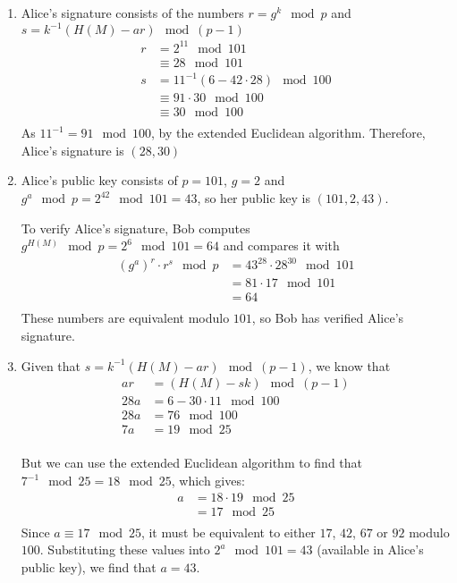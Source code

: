 \begin{enumerate}
\item Alice's signature consists of the numbers $r = g^k\mod p$ and
  $s = k^{-1}(H(M) - ar)\mod (p-1)$
  \begin{align*}
    r &= 2^{11} \mod 101 \\
      &\equiv 28 \mod 101 \\
    s &= 11^{-1}(6 - 42 \cdot 28)\mod 100 \\
      &\equiv 91 \cdot 30\mod 100 \\
      &\equiv 30 \mod 100\\
  \end{align*}
  As $11^{-1} = 91\mod 100$, by the extended Euclidean algorithm. Therefore, Alice's signature is $(28, 30)$

\item Alice's public key consists of $p = 101$, $g = 2$ and $g^a \mod p = 2^{42}
  \mod 101 = 43$, so her public key is $(101, 2, 43)$.

  To verify Alice's signature, Bob computes $g^{H(M)} \mod p = 2^6 \mod 101 = 64$
  and compares it with
  \begin{align*}
    (g^a)^r \cdot r^s \mod p &= 43^{28} \cdot 28^{30} \mod 101 \\
                             &= 81 \cdot 17 \mod 101 \\
                             &= 64 \\
  \end{align*}
  These numbers are equivalent modulo $101$, so Bob has verified Alice's signature.

\item Given that $s = k^{-1}(H(M) - ar)\mod (p-1)$, we know that
  \begin{align*}
    ar &= (H(M) - sk) \mod (p-1) \\
    28a &= 6 - 30 \cdot 11 \mod 100 \\
    28a &= 76 \mod 100 \\
    7a &= 19 \mod 25 \\
  \end{align*}

  But we can use the extended Euclidean algorithm to find that $7^{-1} \mod 25
  = 18 \mod 25$, which gives:
  \begin{align*}
    a &= 18 \cdot 19 \mod 25 \\
      &= 17 \mod 25 \\
  \end{align*}
  Since $a \equiv 17 \mod 25$, it must be equivalent to either $17$, $42$, $67$ or
  $92$ modulo $100$. Substituting these values into $2^{a} \mod 101 = 43$
  (available in Alice's public key), we find that $a = 43$.

\end{enumerate}
